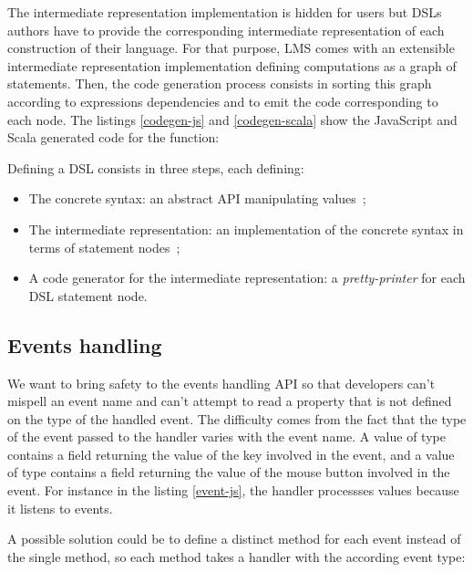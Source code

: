 \documentclass[american,english,runningheads]{llncs}
\begin{document}
The intermediate representation implementation is hidden for users but DSLs authors have to provide the corresponding intermediate representation of each construction of their language. For that purpose, LMS comes with an extensible intermediate representation implementation defining computations as a graph of statements. Then, the code generation process consists in sorting this graph according to expressions dependencies and to emit the code corresponding to each node. The listings \ref{codegen-js} and \ref{codegen-scala} show the JavaScript and Scala generated code for the  function:
\begin{multicols}{2}


\end{multicols}

Defining a DSL consists in three steps, each defining:

\begin{itemize}
\item The concrete syntax: an abstract API manipulating  values~;
\item The intermediate representation: an implementation of the concrete syntax in terms of statement nodes~;
\item A code generator for the intermediate representation: a \emph{pretty-printer} for each DSL statement node.
\end{itemize}

\subsection{Events handling}

We want to bring safety to the events handling API so that developers can’t mispell an event name and can’t attempt to read a property that is not defined on the type of the handled event. The difficulty comes from the fact that the type of the event passed to the handler varies with the event name. A value of type  contains a  field returning the value of the key involved in the event, and a value of type  contains a  field returning the value of the mouse button involved in the event. For instance in the listing \ref{event-js}, the handler processses  values because it listens to  events.

A possible solution could be to define a distinct method for each event instead of the single  method, so each method takes a handler with the according event type:
\end{document}
